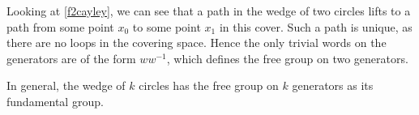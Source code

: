 Looking at \ref{f2cayley}, we can see that a path in the wedge of two circles lifts to a path from some point $x_0$ to some point $x_1$ in this cover.  Such a path is unique, as there are no loops in the covering space.  Hence the only trivial words on the generators are of the form $ww^{-1}$, which defines the free group on two generators.

In general, the wedge of $k$ circles has the free group on $k$ generators as its fundamental group.

